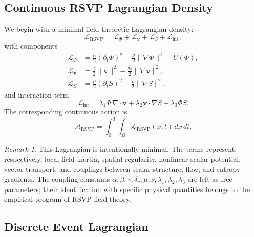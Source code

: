 \documentclass[12pt, twoside]{article}
\theoremstyle{plain}
\theoremstyle{definition}
\theoremstyle{remark}
\newtheorem{remark}[theorem]{Remark}
\begin{document}
\subsection{Continuous RSVP Lagrangian Density}

We begin with a minimal field-theoretic Lagrangian density:
\[
  \mathcal{L}_{\mathrm{RSVP}}
  = \mathcal{L}_{\Phi} + \mathcal{L}_{\mathbf{v}}
    + \mathcal{L}_{S} + \mathcal{L}_{\mathrm{int}},
\]
with components
\begin{align*}
  \mathcal{L}_{\Phi}
    &= \frac{\alpha}{2}(\partial_t \Phi)^2
       - \frac{\beta}{2}\|\nabla\Phi\|^2 - U(\Phi), \\
  \mathcal{L}_{\mathbf{v}}
    &= \frac{\gamma}{2}\|\mathbf{v}\|^2
       - \frac{\delta_v}{2}\|\nabla\mathbf{v}\|^2, \\
  \mathcal{L}_{S}
    &= \frac{\mu}{2}(\partial_t S)^2
       - \frac{\nu}{2}\|\nabla S\|^2,
\end{align*}
and interaction term
\[
  \mathcal{L}_{\mathrm{int}}
  = \lambda_1 \Phi\,\nabla\cdot\mathbf{v}
    + \lambda_2 \mathbf{v}\cdot\nabla S
    + \lambda_3 \Phi S.
\]
The corresponding continuous action is
\[
  \mathcal{A}_{\mathrm{RSVP}}
  = \int_0^T \!\!\int_{\Omega}
    \mathcal{L}_{\mathrm{RSVP}}(x,t)\,dx\,dt.
\]

\begin{remark}
This Lagrangian is intentionally minimal.
The terms represent, respectively, local field inertia, spatial
regularity, nonlinear scalar potential, vector transport,
and couplings between scalar structure, flow, and entropy gradients.
The coupling constants $\alpha, \beta, \gamma, \delta_v, \mu, \nu,
\lambda_1, \lambda_2, \lambda_3$ are left as free parameters;
their identification with specific physical quantities belongs
to the empirical program of RSVP field theory.
\end{remark}

\subsection{Discrete Event Lagrangian}
\end{document}
